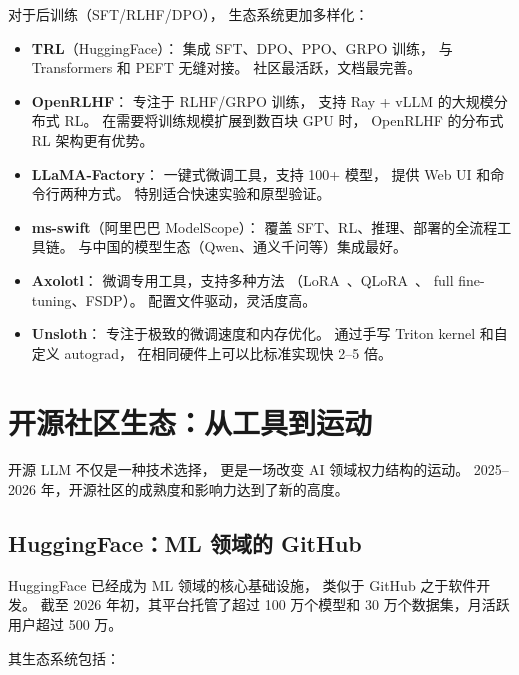 对于后训练（SFT/RLHF/DPO），
生态系统更加多样化：

\begin{itemize}[noitemsep]
  \item \textbf{TRL}（HuggingFace）：
        集成 SFT、DPO、PPO、GRPO 训练，
        与 Transformers 和 PEFT 无缝对接。
        社区最活跃，文档最完善。
  \item \textbf{OpenRLHF}：
        专注于 RLHF/GRPO 训练，
        支持 Ray + vLLM 的大规模分布式 RL。
        在需要将训练规模扩展到数百块 GPU 时，
        OpenRLHF 的分布式 RL 架构更有优势。
  \item \textbf{LLaMA-Factory}：
        一键式微调工具，支持 100+ 模型，
        提供 Web UI 和命令行两种方式。
        特别适合快速实验和原型验证。
  \item \textbf{ms-swift}（阿里巴巴 ModelScope）：
        覆盖 SFT、RL、推理、部署的全流程工具链。
        与中国的模型生态（Qwen、通义千问等）集成最好。
  \item \textbf{Axolotl}：
        微调专用工具，支持多种方法
        （LoRA~\cite{hu2021lora}、QLoRA~\cite{dettmers2023qlora}、
        full fine-tuning、FSDP）。
        配置文件驱动，灵活度高。
  \item \textbf{Unsloth}：
        专注于极致的微调速度和内存优化。
        通过手写 Triton kernel 和自定义 autograd，
        在相同硬件上可以比标准实现快 2--5 倍。
\end{itemize}

\section{开源社区生态：从工具到运动}
\label{sec:opensource-ecosystem}

开源 LLM 不仅是一种技术选择，
更是一场改变 AI 领域权力结构的运动。
2025--2026 年，开源社区的成熟度和影响力达到了新的高度。

\subsection{HuggingFace：ML 领域的 GitHub}

HuggingFace 已经成为 ML 领域的核心基础设施，
类似于 GitHub 之于软件开发。
截至 2026 年初，其平台托管了超过 100 万个模型和
30 万个数据集，月活跃用户超过 500 万。

其生态系统包括：


